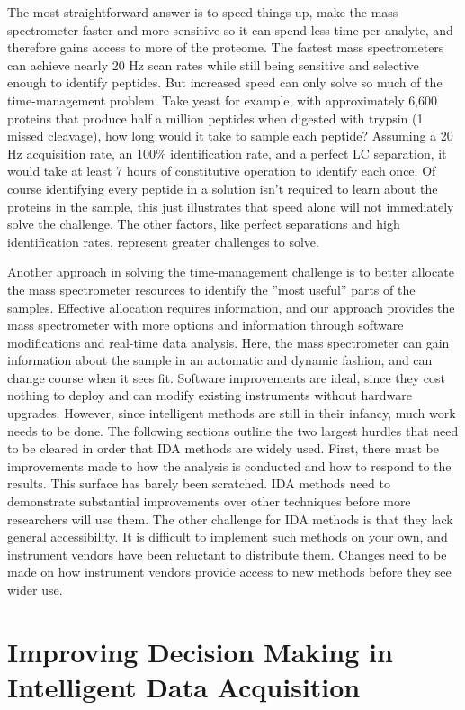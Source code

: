The most straightforward answer is to speed things up, make the mass spectrometer faster and more sensitive so it can spend less time per analyte, and therefore gains access to more of the proteome. The fastest mass spectrometers can achieve nearly 20 Hz scan rates while still being sensitive and selective enough to identify peptides. But increased speed can only solve so much of the time-management problem. Take yeast for example, with approximately 6,600 proteins that produce half a million peptides when digested with trypsin (1 missed cleavage), how long would it take to sample each peptide? Assuming a 20 Hz acquisition rate, an 100\% identification rate, and a perfect LC separation, it would take at least 7 hours of constitutive operation to identify each once. Of course identifying every peptide in a solution isn't required to learn about the proteins in the sample, this just illustrates that speed alone will not immediately solve the challenge. The other factors, like perfect separations and high identification rates, represent greater challenges to solve.

Another approach in solving the time-management challenge is to better allocate the mass spectrometer resources to identify the ''most useful'' parts of the samples. Effective allocation requires information, and our approach provides the mass spectrometer with more options and information through software modifications and real-time data analysis. Here, the mass spectrometer can gain information about the sample in an automatic and dynamic fashion, and can change course when it sees fit. Software improvements are ideal, since they cost nothing to deploy and can modify existing instruments without hardware upgrades. However, since intelligent methods are still in their infancy, much work needs to be done. The following sections outline the two largest hurdles that need to be cleared in order that IDA methods are widely used. First, there must be improvements made to how the analysis is conducted and how to respond to the results. This surface has barely been scratched. IDA methods need to demonstrate substantial improvements over other techniques before more researchers will use them. The other challenge for IDA methods is that they lack general accessibility. It is difficult to implement such methods on your own, and instrument vendors have been reluctant to distribute them. Changes need to be made on how instrument vendors provide access to new methods before they see wider use.

\section{Improving Decision Making in Intelligent Data Acquisition}

